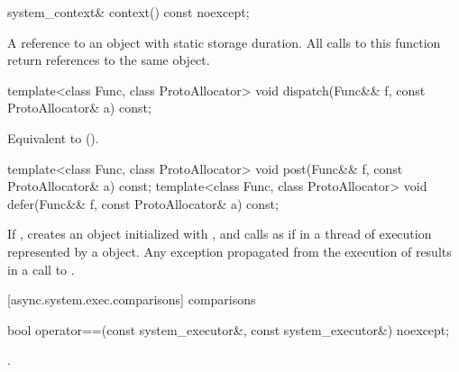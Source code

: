 %
\begin{itemdecl}
system_context& context() const noexcept;
\end{itemdecl}

\begin{itemdescr}
\pnum
\returns A reference to an object with static storage duration. All calls to this function return references to the same object.
\end{itemdescr}

%
\begin{itemdecl}
template<class Func, class ProtoAllocator>
  void dispatch(Func&& f, const ProtoAllocator& a) const;
\end{itemdecl}

\begin{itemdescr}
\pnum
\effects Equivalent to  ().
\end{itemdescr}

%
%
\begin{itemdecl}
template<class Func, class ProtoAllocator>
  void post(Func&& f, const ProtoAllocator& a) const;
template<class Func, class ProtoAllocator>
  void defer(Func&& f, const ProtoAllocator& a) const;
\end{itemdecl}

\begin{itemdescr}
\pnum
\effects If , creates an object  initialized with , and calls  as if in a thread of execution represented by a  object. Any exception propagated from the execution of  results in a call to .
\end{itemdescr}



[async.system.exec.comparisons]{ comparisons}

%
\begin{itemdecl}
bool operator==(const system_executor&, const system_executor&) noexcept;
\end{itemdecl}

\begin{itemdescr}
\pnum
\returns {}.
\end{itemdescr}

